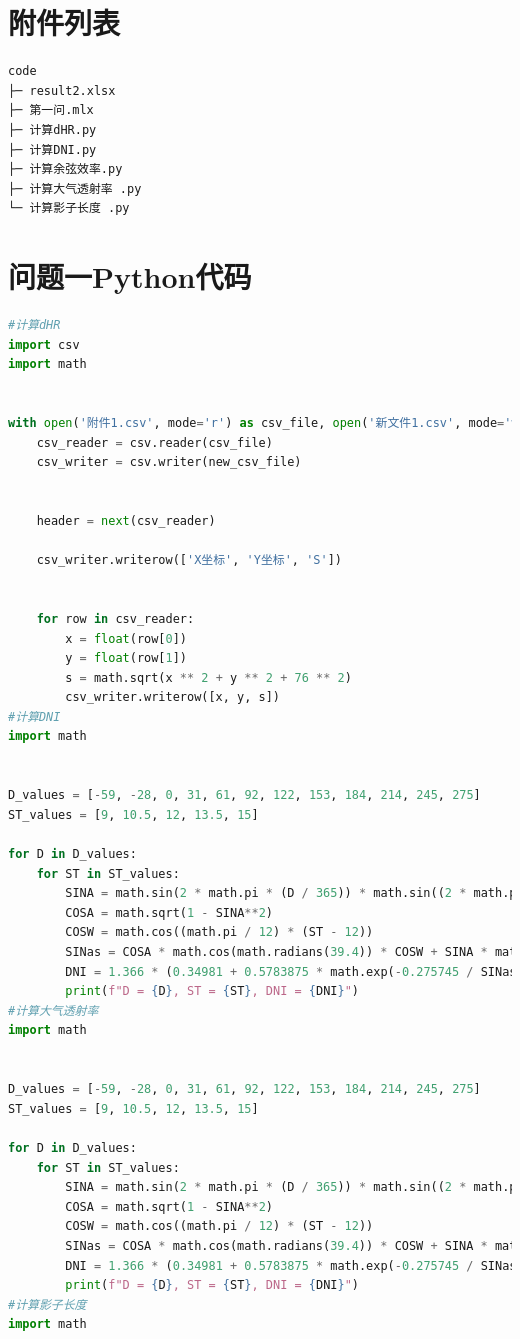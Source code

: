 \documentclass[withoutpreface,bwprint]{cumcmthesis} %
\begin{document}
 \clearpage
\begin{appendices}


\section*{附件列表}
\begin{lstlisting}[language=html]
code
├─ result2.xlsx
├─ 第一问.mlx
├─ 计算dHR.py
├─ 计算DNI.py
├─ 计算余弦效率.py
├─ 计算大气透射率 .py
└─ 计算影子长度 .py
\end{lstlisting}
\section{问题一Python代码}
\begin{lstlisting}[language=python]
#计算dHR
import csv
import math


with open('附件1.csv', mode='r') as csv_file, open('新文件1.csv', mode='w', newline='') as new_csv_file:
    csv_reader = csv.reader(csv_file)
    csv_writer = csv.writer(new_csv_file)


    header = next(csv_reader)

    csv_writer.writerow(['X坐标', 'Y坐标', 'S'])


    for row in csv_reader:
        x = float(row[0])
        y = float(row[1])
        s = math.sqrt(x ** 2 + y ** 2 + 76 ** 2)
        csv_writer.writerow([x, y, s])
#计算DNI
import math


D_values = [-59, -28, 0, 31, 61, 92, 122, 153, 184, 214, 245, 275]
ST_values = [9, 10.5, 12, 13.5, 15]

for D in D_values:
    for ST in ST_values:
        SINA = math.sin(2 * math.pi * (D / 365)) * math.sin((2 * math.pi / 360) * 23.45)
        COSA = math.sqrt(1 - SINA**2)
        COSW = math.cos((math.pi / 12) * (ST - 12))
        SINas = COSA * math.cos(math.radians(39.4)) * COSW + SINA * math.sin(math.radians(39.4))
        DNI = 1.366 * (0.34981 + 0.5783875 * math.exp(-0.275745 / SINas))
        print(f"D = {D}, ST = {ST}, DNI = {DNI}")
#计算大气透射率
import math


D_values = [-59, -28, 0, 31, 61, 92, 122, 153, 184, 214, 245, 275]
ST_values = [9, 10.5, 12, 13.5, 15]

for D in D_values:
    for ST in ST_values:
        SINA = math.sin(2 * math.pi * (D / 365)) * math.sin((2 * math.pi / 360) * 23.45)
        COSA = math.sqrt(1 - SINA**2)
        COSW = math.cos((math.pi / 12) * (ST - 12))
        SINas = COSA * math.cos(math.radians(39.4)) * COSW + SINA * math.sin(math.radians(39.4))
        DNI = 1.366 * (0.34981 + 0.5783875 * math.exp(-0.275745 / SINas))
        print(f"D = {D}, ST = {ST}, DNI = {DNI}")
#计算影子长度
import math



\end{lstlisting}
\end{appendices}
\end{document}
